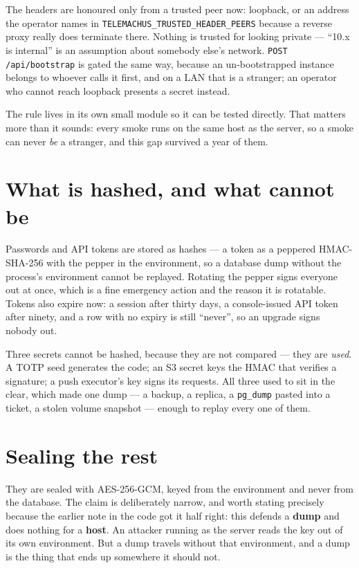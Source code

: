 \documentclass[11pt,a4paper]{report}
\begin{document}
The headers are honoured only from a trusted peer now: loopback, or an address the operator names in \texttt{TELEMACHUS\_TRUSTED\_HEADER\_PEERS} because a reverse proxy really does terminate there. Nothing is trusted for looking private --- ``10.x is internal'' is an assumption about somebody else's network. \texttt{POST /api/bootstrap} is gated the same way, because an un-bootstrapped instance belongs to whoever calls it first, and on a LAN that is a stranger; an operator who cannot reach loopback presents a secret instead.

The rule lives in its own small module so it can be tested directly. That matters more than it sounds: every smoke runs on the same host as the server, so a smoke can never \emph{be} a stranger, and this gap survived a year of them.

\section{What is hashed, and what cannot be}

Passwords and API tokens are stored as hashes --- a token as a peppered HMAC-SHA-256 with the pepper in the environment, so a database dump without the process's environment cannot be replayed. Rotating the pepper signs everyone out at once, which is a fine emergency action and the reason it is rotatable. Tokens also expire now: a session after thirty days, a console-issued API token after ninety, and a row with no expiry is still ``never'', so an upgrade signs nobody out.

Three secrets cannot be hashed, because they are not compared --- they are \emph{used}. A TOTP seed generates the code; an S3 secret keys the HMAC that verifies a signature; a push executor's key signs its requests. All three used to sit in the clear, which made one dump --- a backup, a replica, a \texttt{pg\_dump} pasted into a ticket, a stolen volume snapshot --- enough to replay every one of them.

\section{Sealing the rest}

They are sealed with AES-256-GCM, keyed from the environment and never from the database. The claim is deliberately narrow, and worth stating precisely because the earlier note in the code got it half right: this defends a \textbf{dump} and does nothing for a \textbf{host}. An attacker running as the server reads the key out of its own environment. But a dump travels without that environment, and a dump is the thing that ends up somewhere it should not.
\end{document}
